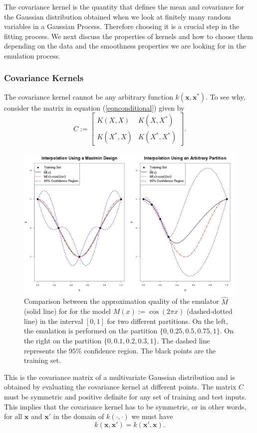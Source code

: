 \documentclass{sfuthesis}
\newcommand{\x}{\textbf{x}}
\begin{document}
The covariance kernel is the quantity that defines the mean and covariance for
the Gaussian distribution obtained when we look at finitely many random variables in 
a Gaussian Process. Therefore choosing it
is a crucial step in the fitting process. We next discuss the properties
of kernels and how to choose them depending on the data and the smoothness properties we are looking
for in the emulation process. 

\subsubsection*{Covariance Kernels}
The covariance kernel cannot be any arbitrary function $k(\x,\x^{*})$. To see why, consider  the
matrix in  equation (\ref{eqnconditional}) given by
\begin{equation*}
C:=\begin{bmatrix} K(X,X) & K(X,X^{*}) \\
 K(X^{*},X) & K(X^{*},X^{*}) \end{bmatrix}.
\end{equation*}

\begin{figure}[H]
\raggedleft
\includegraphics[scale=0.33]{./FigChap2/partitionComparison}
\caption{Comparison between the approximation quality of the emulator $\widehat{M}$ (solid line) for 
for the model $M(x):=\cos(2\pi x)$ (dashed-dotted line) in the interval $[0,1]$ for two different partitions. 
On the left, the emulation is performed on the partition $\{0,0.25,0.5,0.75,1\}$. On
the right on the partition $\{0,0.1,0.2,0.3,1\}$. The dashed line represents the $95\%$ confidence region. The
black points are the training set.}
\label{figChp2}
\end{figure}
\noindent
This is the covariance matrix of a multivariate Gaussian distribution and is obtained by evaluating
the covariance kernel at different points. The matrix $C$ must be  symmetric and  positive definite 
for any set of training and test inputs. This implies that the covariance kernel has to be symmetric,
or in other words, for all $\x$ and $\x'$ in the domain of $k(\cdot,\cdot)$ we must have
\begin{equation*}
k(\x,\x')=k(\x',\x).
\end{equation*}
\end{document}
